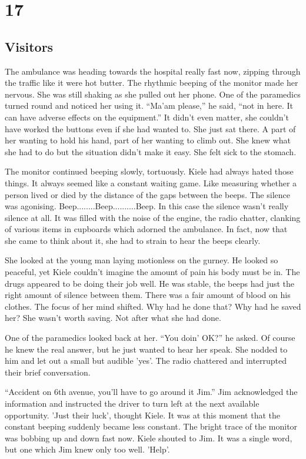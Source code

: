 \chapter{17}
\section{Visitors}


The ambulance was heading towards the hospital really fast now, zipping through the traffic like it were hot butter.  The rhythmic beeping of the monitor made her nervous.  She was still shaking as she pulled out her phone.  One of the paramedics turned round and noticed her using it.  ``Ma'am please,'' he said, ``not in here.  It can have adverse effects on the equipment.''  It didn't even matter, she couldn't have worked the buttons even if she had wanted to.  She just sat there.  A part of her wanting to hold his hand, part of her wanting to climb out.  She knew what she had to do but the situation didn't make it easy.  She felt sick to the stomach.  

The monitor continued beeping slowly, tortuously.  Kiele had always hated those things.  It always seemed like a constant waiting game.  Like measuring whether a person lived or died by the distance of the gaps between the beeps.  The silence was agonising.  Beep........Beep..........Beep.  In this case the silence wasn't really silence at all.  It was filled with the noise of the engine, the radio chatter, clanking of various items in cupboards which adorned the ambulance.  In fact, now that she came to think about it, she had to strain to hear the beeps clearly.

She looked at the young man laying motionless on the gurney.  He looked so peaceful, yet Kiele couldn't imagine the amount of pain his body must be in.  The drugs appeared to be doing their job well.  He was stable, the beeps had just the right amount of silence between them.  There was a fair amount of blood on his clothes.  The focus of her mind shifted.  Why had he done that?  Why had he saved her?  She wasn't worth saving.  Not after what she had done.

One of the paramedics looked back at her.  ``You doin' OK?'' he asked.  Of course he knew the real answer, but he just wanted to hear her speak.  She nodded to him and let out a small but audible 'yes'.  The radio chattered and interrupted their brief conversation.

``Accident on 6th avenue, you'll have to go around it Jim.''  Jim acknowledged the information and instructed the driver to turn left at the next available opportunity.  'Just their luck', thought Kiele.  It was at this moment that the constant beeping suddenly became less constant.  The bright trace of the monitor was bobbing up and down fast now.  Kiele shouted to Jim.  It was a single word, but one which Jim knew only too well.  'Help'.

